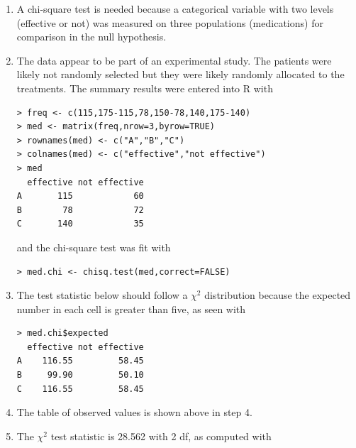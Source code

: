 \documentclass[10pt,openany]{book}\usepackage[]{graphicx}\usepackage[]{color}
\makeatletter
\newenvironment{kframe}{%
 \def\at@end@of@kframe{}%
 \ifinner\ifhmode%
  \def\at@end@of@kframe{\end{minipage}}%
  \begin{minipage}{\columnwidth}%
 \fi\fi%
 \def\FrameCommand##1{\hskip\@totalleftmargin \hskip-\fboxsep
 \colorbox{shadecolor}{##1}\hskip-\fboxsep
     \hskip-\linewidth \hskip-\@totalleftmargin \hskip\columnwidth}%
 \MakeFramed {\advance\hsize-\width
   \@totalleftmargin\z@ \linewidth\hsize
   \@setminipage}}%
 {\par\unskip\endMakeFramed%
 \at@end@of@kframe}
\newenvironment{knitrout}{}{} %
\makeatother
\begin{document}
\begin{itemize}
\begin{enumerate}
      \item A chi-square test is needed because a categorical variable with two levels (effective or not) was measured on three populations (medications) for comparison in the null hypothesis.
      \item The data appear to be part of an experimental study.  The patients were likely not randomly selected but they were likely randomly allocated to the treatments.  The summary results were entered into R with
\begin{knitrout}
\color{fgcolor}\begin{kframe}
\begin{verbatim}
> freq <- c(115,175-115,78,150-78,140,175-140)
> med <- matrix(freq,nrow=3,byrow=TRUE)
> rownames(med) <- c("A","B","C")
> colnames(med) <- c("effective","not effective")
> med
  effective not effective
A       115            60
B        78            72
C       140            35
\end{verbatim}
\end{kframe}
\end{knitrout}
and the chi-square test was fit with
\begin{knitrout}
\color{fgcolor}\begin{kframe}
\begin{verbatim}
> med.chi <- chisq.test(med,correct=FALSE)
\end{verbatim}
\end{kframe}
\end{knitrout}
      \item The test statistic below should follow a $\chi^{2}$ distribution because the expected number in each cell is greater than five, as seen with
\begin{knitrout}
\color{fgcolor}\begin{kframe}
\begin{verbatim}
> med.chi$expected
  effective not effective
A    116.55         58.45
B     99.90         50.10
C    116.55         58.45
\end{verbatim}
\end{kframe}
\end{knitrout}
      \item The table of observed values is shown above in step 4.
      \item The $\chi^{2}$ test statistic is 28.562 with 2 df, as computed with
\begin{knitrout}

\end{knitrout}
\end{enumerate}
\end{itemize}
\end{document}
